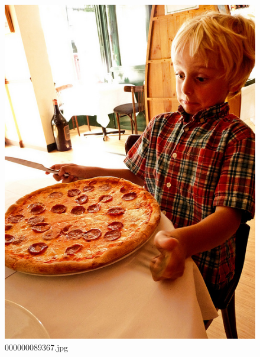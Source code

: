     \begin{figure}[h]
        \centering
        \includegraphics[width=0.8\linewidth]{../image set/easy/000000089367.jpg}
        \caption{000000089367.jpg}
    \end{figure}
